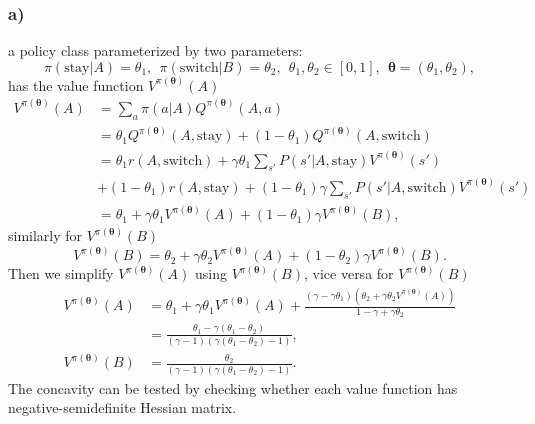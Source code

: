 \documentclass[12pt]{article}
\begin{document}
\subsubsection*{a)}
a policy class parameterized by two parameters:
\begin{equation*}
    \pi(\text{stay}|A) = \theta_1, ~~ \pi(\text{switch}|B) = \theta_2, ~~ \theta_1, \theta_2 \in [0,1], ~~ \mathbf{\boldsymbol\theta} = (\theta_1, \theta_2),
\end{equation*}
has the value function $V^{\pi(\boldsymbol\theta)}(A)$
\begin{equation*}
    \begin{split}
        V^{\pi(\boldsymbol\theta)}(A) &= \sum_a \pi(a|A)Q^{\pi(\boldsymbol{\theta})}(A,a)    \\
        &= \theta_1 Q^{\pi(\boldsymbol{\theta})}(A,\text{stay}) + (1-\theta_1)Q^{\pi(\boldsymbol{\theta})}(A,\text{switch})\\
        &= \theta_1r(A,\text{switch}) + \gamma\theta_1\sum_{s'}P(s'|A,\text{stay})V^{\pi(\boldsymbol\theta)}(s')\\ & + (1-\theta_1)r(A,\text{stay}) + (1-\theta_1)\gamma\sum_{s'}P(s'|A,\text{switch})V^{\pi(\boldsymbol\theta)}(s') \\
        &= \theta_1 + \gamma\theta_1V^{\pi(\boldsymbol\theta)}(A) + (1 - \theta_1)\gamma V^{\pi(\boldsymbol\theta)}(B),
    \end{split}
\end{equation*}
similarly for $V^{\pi(\boldsymbol\theta)}(B)$
\begin{equation*}
    V^{\pi(\boldsymbol\theta)}(B) = \theta_2 + \gamma\theta_2V^{\pi(\boldsymbol\theta)}(A) + (1-\theta_2)\gamma V^{\pi(\boldsymbol\theta)}(B).
\end{equation*}
Then we simplify $V^{\pi(\boldsymbol\theta)}(A)$ using $V^{\pi(\boldsymbol\theta)}(B)$, vice versa for $V^{\pi(\boldsymbol\theta)}(B)$
\begin{equation*}
    \begin{split}
        V^{\pi(\boldsymbol\theta)}(A) &= \theta_1 + \gamma\theta_1V^{\pi(\boldsymbol\theta)}(A) + \frac{(\gamma - \gamma\theta_1)(\theta_2 + \gamma\theta_2V^{\pi(\boldsymbol\theta)}(A))}{1-\gamma+\gamma\theta_2}     \\
        &= \frac{\theta_1 - \gamma(\theta_1 - \theta_2)}{(\gamma-1)(\gamma(\theta_1 - \theta_2)-1)}, \\
        V^{\pi(\boldsymbol\theta)}(B) &= \frac{\theta_2}{(\gamma-1)(\gamma(\theta_1 - \theta_2)-1)}.
    \end{split}
\end{equation*}
The concavity can be tested by checking whether each value function has negative-semidefinite Hessian matrix.
\end{document}
